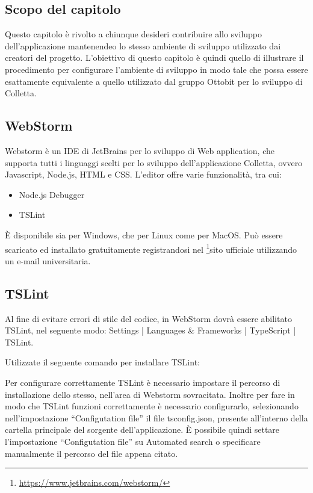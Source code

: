 \subsection{Scopo del capitolo}
Questo capitolo è rivolto a chiunque desideri contribuire allo sviluppo dell'applicazione mantenendeo lo stesso ambiente di sviluppo utilizzato dai creatori del progetto.
L'obiettivo di questo capitolo è quindi quello di illustrare il procedimento per configurare l'ambiente di sviluppo in modo tale che possa essere esattamente equivalente a quello utilizzato dal gruppo Ottobit per lo sviluppo di Colletta.

\subsection{WebStorm}
Webstorm è un IDE di JetBrains per lo sviluppo di Web application, che supporta tutti i linguaggi scelti per lo sviluppo dell'applicazione Colletta, ovvero Javascript, Node.js, HTML e CSS.
L'editor offre varie funzionalità, tra cui:
\begin{itemize}
	\item Node.js Debugger
	\item TSLint
\end{itemize}
È disponibile sia per Windows, che per Linux come per MacOS.
Può essere scaricato ed installato gratuitamente registrandosi nel \footnote{\url{https://www.jetbrains.com/webstorm/}}sito ufficiale utilizzando un e-mail universitaria.

\subsection{TSLint}
Al fine di evitare errori di stile del codice, in WebStorm dovrà essere abilitato TSLint, nel seguente modo: Settings | Languages \& Frameworks | TypeScript | TSLint.

Utilizzate il seguente comando per installare TSLint:
\begin{center}
	\noindent{}
\end{center}
Per configurare correttamente TSLint è necessario impostare il percorso di installazione dello stesso, nell'area di Webstorm sovracitata.
Inoltre per fare in modo che TSLint funzioni correttamente è necessario configurarlo, selezionando nell'impostazione ``Configutation file'' il file tsconfig.json, presente all'interno della cartella principale del sorgente dell'applicazione. È possibile quindi settare l'impostazione ``Configutation file'' su Automated search o specificare manualmente il percorso del file appena citato.

